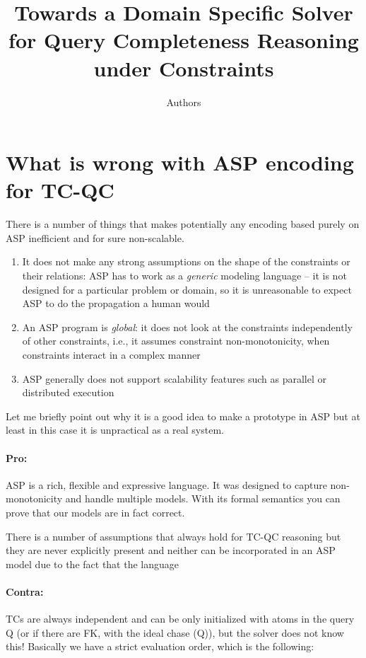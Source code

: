 \documentclass{article}
\author{Authors}
\title{Towards a Domain Specific Solver for Query Completeness Reasoning under Constraints}
\begin{document}
\maketitle

\section{What is wrong with ASP encoding for TC-QC}

There is a number of things that makes potentially any encoding based purely on ASP inefficient and for sure non-scalable.

\begin{enumerate}
  \item It does not make any strong assumptions on the shape of the constraints or their relations: ASP has to work as a \textit{generic} modeling language -- it is not designed for a particular problem or domain, so it is unreasonable to expect ASP to do the propagation a human would
  \item An ASP program is \textit{global}: it does not look at the constraints independently of other constraints, i.e., it assumes constraint non-monotonicity, when constraints interact in a complex manner
  \item ASP generally does not support scalability features such as parallel or distributed execution
\end{enumerate}

Let me briefly point out why it is a good idea to make a prototype in ASP but at least in this case it is unpractical as a real system.

\paragraph{Pro:} ASP is a rich, flexible and expressive language. It was designed to capture non-monotonicity and handle multiple models. With its formal semantics you can prove that our models are in fact correct.

There is a number of assumptions that always hold for TC-QC reasoning but they are never explicitly present and neither can be incorporated in an ASP model due to the fact that the language 
\paragraph{Contra:} TCs are always independent and can be only initialized with atoms in the query Q (or if there are FK, with the ideal chase (Q)), but the solver does not know this! Basically we have a strict evaluation order, which is the following:
\pagebreak
\end{document}
